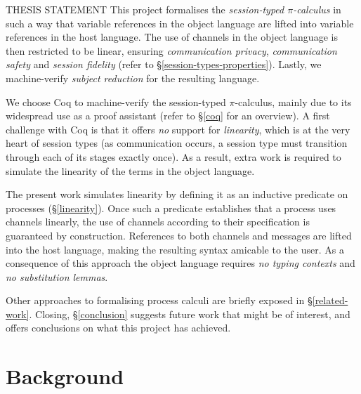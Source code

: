 \documentclass{mproj}
\newcommand{\picalc}{$\pi$-calculus}
\begin{document}
\begin{thesis-statement}{THESIS STATEMENT}
    This project formalises the \emph{session-typed \picalc{}} in such a way that variable references in the object language are lifted into variable references in the host language. The use of channels in the object language is then restricted to be linear, ensuring \emph{communication privacy}, \emph{communication safety} and \emph{session fidelity} (refer to \S \ref{session-types-properties}). Lastly, we machine-verify \emph{subject reduction} for the resulting language.
\end{thesis-statement}


We choose Coq \cite{Coquand1989, CoqDeveloperCommunity} to machine-verify the session-typed \picalc{}, mainly due to its widespread use as a proof assistant (refer to \S \ref{coq} for an overview). A first challenge with Coq is that it offers \emph{no} support for \emph{linearity}, which is at the very heart of session types (as communication occurs, a session type must transition through each of its stages exactly once). As a result, extra work is required to simulate the linearity of the terms in the object language.

The present work simulates linearity by defining it as an inductive predicate on processes (\S \ref{linearity}). Once such a predicate establishes that a process uses channels linearly, the use of channels according to their specification is guaranteed by construction. References to both channels and messages are lifted into the host language, making the resulting syntax amicable to the user. As a consequence of this approach the object language requires \emph{no typing contexts} and \emph{no substitution lemmas}.

Other approaches to formalising process calculi are briefly exposed in \S \ref{related-work}. Closing, \S \ref{conclusion} suggests future work that might be of interest, and offers conclusions on what this project has achieved.

\chapter{Background}

\end{document}
